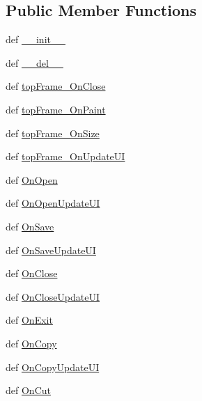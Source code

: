 \subsection*{Public Member Functions}
\begin{DoxyCompactItemize}
\item 
def \hyperlink{classtop_frame_1_1_top_frame_aef31eddf36a67e6d7acf46e74c0d798e}{\-\_\-\-\_\-init\-\_\-\-\_\-}
\item 
def \hyperlink{classtop_frame_1_1_top_frame_a382284d24a1fc872d6fd991ba453efc6}{\-\_\-\-\_\-del\-\_\-\-\_\-}
\item 
def \hyperlink{classtop_frame_1_1_top_frame_afd791a7462b1b8bc8c125c67c26d919f}{top\-Frame\-\_\-\-On\-Close}
\item 
def \hyperlink{classtop_frame_1_1_top_frame_ab015d357a61e776a6706216e3d753dc9}{top\-Frame\-\_\-\-On\-Paint}
\item 
def \hyperlink{classtop_frame_1_1_top_frame_aa248a2960760ffce8c20ee7f31a48338}{top\-Frame\-\_\-\-On\-Size}
\item 
def \hyperlink{classtop_frame_1_1_top_frame_aed3ffbcf897fa6ef9af91fa7d0f528c5}{top\-Frame\-\_\-\-On\-Update\-U\-I}
\item 
def \hyperlink{classtop_frame_1_1_top_frame_a6db43140ce7c8819a85c4b71d2d39372}{On\-Open}
\item 
def \hyperlink{classtop_frame_1_1_top_frame_a8a220b7e04fb0e52ff5f847d52198490}{On\-Open\-Update\-U\-I}
\item 
def \hyperlink{classtop_frame_1_1_top_frame_a3bf119c8b63122fa7bb768d89d1da19e}{On\-Save}
\item 
def \hyperlink{classtop_frame_1_1_top_frame_a9a74c20a66c6414a82612abd6b7a5fc8}{On\-Save\-Update\-U\-I}
\item 
def \hyperlink{classtop_frame_1_1_top_frame_a058b8d387613998277c124bbb123493d}{On\-Close}
\item 
def \hyperlink{classtop_frame_1_1_top_frame_a103471d04670eda55c0ba15a4c433064}{On\-Close\-Update\-U\-I}
\item 
def \hyperlink{classtop_frame_1_1_top_frame_af95379a4a07d070daff3a41f59ce5435}{On\-Exit}
\item 
def \hyperlink{classtop_frame_1_1_top_frame_aea801b0866b2e9ed875f6051b6bd7d81}{On\-Copy}
\item 
def \hyperlink{classtop_frame_1_1_top_frame_aa9bce3d0d4dd95d0865d30db7d17445d}{On\-Copy\-Update\-U\-I}
\item 
def \hyperlink{classtop_frame_1_1_top_frame_a4549bc2bf4c06e6a68bcde4356be48ce}{On\-Cut}

\end{DoxyCompactItemize}
